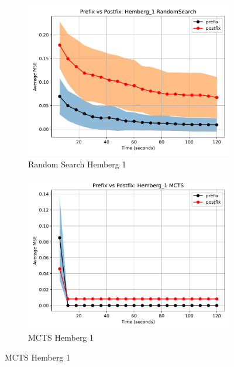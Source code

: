 \documentclass[runningheads]{llncs}
\begin{document}
\begin{figure}
    \centering
    
    \begin{subfigure}[b]{0.4\textwidth}
        \includegraphics[width=\linewidth, keepaspectratio]{Hemberg_Benchmarks/PrePostHemberg_1RandomSearch.pdf}
        \caption{Random Search Hemberg 1}
        \label{subfig:hemberg_1_RS}
    \end{subfigure}
    \begin{subfigure}[b]{0.4\textwidth}
        \includegraphics[width=\linewidth, keepaspectratio]{Hemberg_Benchmarks/PrePostHemberg_1MCTS.pdf}
        \caption{MCTS Hemberg 1}
        \label{subfig:hemberg_1_MCTS}
    \end{subfigure}
    

\end{figure}
\end{document}
